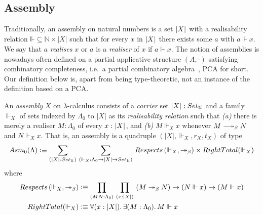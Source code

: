 \documentclass[a4paper,UKenglish,numberwithinsect,cleveref,thm-restate]{lipics-v2021}
\numberwithin{equation}{section}
\theoremstyle{plain}
\begin{document}
\subsection{Assembly}
Traditionally, an assembly on natural numbers is a set $\mathopen{}\left|X\right|_{}^{}\mathclose{}$ with a realisability relation $\mathord{\Vdash} \subseteq \mathbb{N} \times |X|$ such that for every $x$ in $\mathopen{}\left|X\right|_{}^{}\mathclose{}$ there exists some $a$ with $a \Vdash x$.
We say that $a$ \emph{realises} $x$ or $a$ is a \emph{realiser} of $x$ if $a \Vdash x$.
The notion of assemblies is nowadays often defined on a partial applicative structure $(A, \cdot)$ satisfying combinatory completeness, i.e.\ a partial combinatory algebra~\cite{Oosten2008}, PCA for short.
Our definition below is, apart from being type-theoretic, not an instance of the definition based on a PCA.
\begin{definition}\label{def:assembly}
  An \emph{assembly} $X$ on $\lambda$-calculus consists of a \emph{carrier} set $|X| : \setU$ and a family ${\Vdash_X}$ of sets indexed by $\Lambda_0$ to $|X|$ as its \emph{realisability relation} such that
  \emph{(a)} there is merely a realiser $M : \Lambda_0$ of every $x : \mathopen{}\left|X\right|_{}^{}\mathclose{}$, and
  \emph{(b)} $M \Vdash_X x$ whenever $M \reduce N$ and $N \Vdash_X x$.
  That is, an assembly is a quadruple $(|X|, \Vdash_X, r_X, t_X)$ of type
  \[
    \Asm_0(\Lambda) \defeq \sm{\bproj{X} : {\setU}}{\mathord{\Vdash_X}:\Lambda_0 \to |X| \to \setU} 
      \mathsf{Respects}\left(\Vdash_X, \mathord{\twoheadrightarrow_\beta}\right)
      \times \mathsf{RightTotal}({\Vdash_X})
  \]
  where
  \begin{align}
    \mathsf{Respects}\left(\mathord{\Vdash_X}, \mathord{\twoheadrightarrow_\beta}\right) & \defeq\prd{M N : \Lambda_0}{x : |X|} \left(M \twoheadrightarrow_ \beta N\right) \to \left(N \Vdash x\right) \to \left(M \Vdash x\right) \label{def:respect-reduction} \\      
    \mathsf{RightTotal}(\Vdash_X) & \defeq \fall{x : |X|}\exis{M : \Lambda_0} M \Vdash x
    \label{def:right-total}
  \end{align}
\end{definition}
\end{document}
